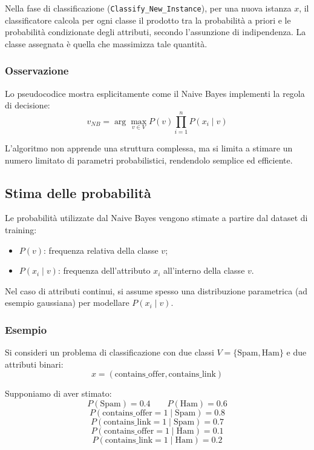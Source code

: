 \documentclass[a4paper,12pt]{report}
\begin{document}
Nella fase di classificazione (\texttt{Classify\_New\_Instance}), per una nuova istanza \( x \), il classificatore calcola per ogni classe il prodotto tra la probabilità a priori e le probabilità condizionate degli attributi, secondo l’assunzione di indipendenza.
La classe assegnata è quella che massimizza tale quantità.

\subsubsection*{Osservazione}

Lo pseudocodice mostra esplicitamente come il Naive Bayes implementi la regola di decisione:
\[
v_{NB} = \arg\max_{v \in V} P(v)\prod_{i=1}^{n} P(x_i \mid v)
\]

L’algoritmo non apprende una struttura complessa, ma si limita a stimare un numero limitato di parametri probabilistici, rendendolo semplice ed efficiente.


\subsection{Stima delle probabilità}

Le probabilità utilizzate dal Naive Bayes vengono stimate a partire dal dataset di training:
\begin{itemize}
    \item \( P(v) \): frequenza relativa della classe \( v \);
    \item \( P(x_i \mid v) \): frequenza dell’attributo \( x_i \) all’interno della classe \( v \).
\end{itemize}

Nel caso di attributi continui, si assume spesso una distribuzione parametrica (ad esempio gaussiana) per modellare \( P(x_i \mid v) \).


\subsubsection{Esempio}

Si consideri un problema di classificazione con due classi \( V = \{\text{Spam}, \text{Ham}\} \) e due attributi binari:
\[
x = (\text{contains\_offer}, \text{contains\_link})
\]

Supponiamo di aver stimato:
\[
P(\text{Spam}) = 0.4 \qquad P(\text{Ham}) = 0.6
\]
\[
P(\text{contains\_offer} = 1 \mid \text{Spam}) = 0.8
\]
\[
P(\text{contains\_link} = 1 \mid \text{Spam}) = 0.7
\]
\[
P(\text{contains\_offer} = 1 \mid \text{Ham}) = 0.1
\]
\[
P(\text{contains\_link} = 1 \mid \text{Ham}) = 0.2
\]
\end{document}
